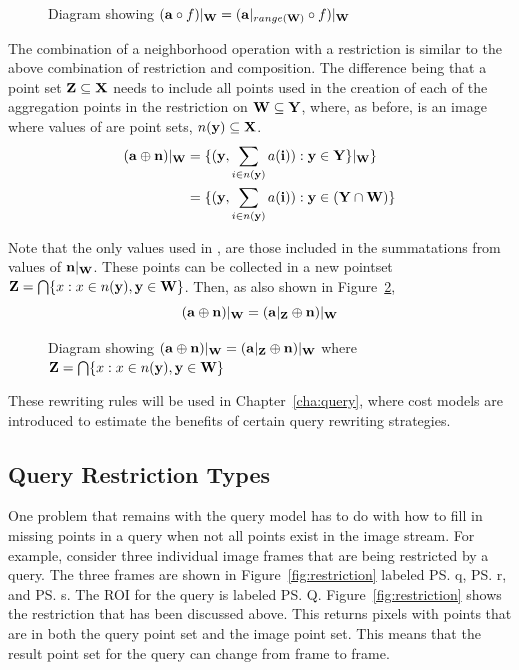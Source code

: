 \documentclass{ucdthesis}       %
\begin{document}
\begin{figure}[htb]
  \centering
  \scalebox{0.8}{}
  \caption{Diagram showing $({\bf{a}} \circ f)|_{{\bf{W}}} = ({\bf{a}}|_{range({\bf{W}})} \circ f)|_{\bf{W}}$}
  \label{fig:rangefw}
\end{figure}

The combination of a neighborhood operation with a restriction is
similar to the above combination of restriction and composition.  The
difference being that a point set ${\bf{Z}} \subseteq {\ensuremath{\bf{X}}}$ needs to
include all points used in the creation of each of the aggregation
points in the restriction on ${\bf{W}} \subseteq {\ensuremath{\bf{Y}}}$, where, as
before,  is an image where values of  are point sets,
$n({\bf{y}}) \subseteq {\ensuremath{\bf{X}}}$.
\begin{align*}
  ({\bf{a}} \oplus {\ensuremath{\bf{n}}})|_{{\bf{W}}} &= \{({\bf{y}},\sum_{i \in n({\bf{y}})} a({\bf{i}})) : {\bf{y}}\in{\ensuremath{\bf{Y}}}\} |_{\bf{W}} \} \\
  &= \{({\bf{y}},\sum_{i \in n({\bf{y}})} a({\bf{i}})) : {\bf{y}}\in ({\bf{Y}}\cap{\ensuremath{\bf{W}}}) \}
\end{align*}
 
Note that the only values used in , are those included in the
summatations from values of ${\bf{n}}|_{{\bf{W}}}$.  These points can be
collected in a new pointset ${\bf{Z}}=\bigcap \{ x : x \in n({\bf{y}}),
{\bf{y}} \in {\ensuremath{\bf{W}}}\}$. Then, as also shown in Figure~\ref{fig:neighbor-restrict},
\[({\bf{a}} \oplus {\ensuremath{\bf{n}}})|_{{\bf{W}}} = ({\bf{a}}|_{{\bf{Z}}} \oplus
{\ensuremath{\bf{n}}})|_{{\bf{W}}}\]

\begin{figure}[htb]
  \centering
  \scalebox{0.8}{}
  \caption[Diagram showing $(\im{a} \oplus \im{n})|_{\ps{W}} = (\im{a}|_{\ps{Z}} \oplus \im{n})|_{\ps{W}}$]{Diagram showing $(\im{a} \oplus \im{n})|_{\ps{W}} = (\im{a}|_{\ps{Z}} \oplus \im{n})|_{\ps{W}}$ where ${\bf{Z}}=\bigcap \{ x : x \in n({\bf{y}}),{\bf{y}} \in {\ensuremath{\bf{W}}}\}$}
  \label{fig:neighbor-restrict}
\end{figure}
 
These rewriting rules will be used in Chapter~\ref{cha:query}, where
cost models are introduced to estimate the benefits of certain query
rewriting strategies.

\subsection{Query Restriction Types}
\label{sec:restriction-types}

One problem that remains with the query model has to do with how to
fill in missing points in a query when not all points exist in the
image stream.  For example, consider three individual image frames
that are being restricted by a query.  The three frames are shown in
Figure~\ref{fig:restriction} labeled \ps{q}, \ps{r}, and \ps{s}.  The
\ac{ROI} for the query is labeled \ps{Q}.
Figure~\ref{fig:restriction} shows the restriction that has been
discussed above.  This returns pixels with points that are in both the
query point set and the image point set.  This means that the result
point set for the query can change from frame to frame.
\end{document}
